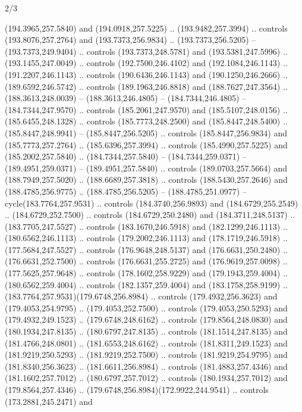 \begin{flagdescription}{2/3}
\begin{scope}[xshift=0.5\flaglength,yshift=0.5\flagwidth,scale=\flagwidth/235.81]
\begin{scope}[y=0.8pt, x=0.8pt, yscale=-1,shift={(-239.08,-147.38)}]
    (194.3965,257.5840) and (194.0918,257.5225) .. (193.9482,257.3994) .. controls
    (193.8076,257.2764) and (193.7373,256.9834) .. (193.7373,256.5205) --
    (193.7373,249.9404) .. controls (193.7373,248.5781) and (193.5381,247.5996) ..
    (193.1455,247.0049) .. controls (192.7500,246.4102) and (192.1084,246.1143) ..
    (191.2207,246.1143) .. controls (190.6436,246.1143) and (190.1250,246.2666) ..
    (189.6592,246.5742) .. controls (189.1963,246.8818) and (188.7627,247.3564) ..
    (188.3613,248.0039) -- (188.3613,246.4805) -- (184.7344,246.4805) --
    (184.7344,247.9570) .. controls (185.2061,247.9570) and (185.5107,248.0156) ..
    (185.6455,248.1328) .. controls (185.7773,248.2500) and (185.8447,248.5400) ..
    (185.8447,248.9941) -- (185.8447,256.5205) .. controls (185.8447,256.9834) and
    (185.7773,257.2764) .. (185.6396,257.3994) .. controls (185.4990,257.5225) and
    (185.2002,257.5840) .. (184.7344,257.5840) -- (184.7344,259.0371) --
    (189.4951,259.0371) -- (189.4951,257.5840) .. controls (189.0703,257.5664) and
    (188.7949,257.5020) .. (188.6689,257.3818) .. controls (188.5430,257.2646) and
    (188.4785,256.9775) .. (188.4785,256.5205) -- (188.4785,251.0977) --
    cycle(183.7764,257.9531) .. controls (184.3740,256.9893) and
    (184.6729,255.2549) .. (184.6729,252.7500) .. controls (184.6729,250.2480) and
    (184.3711,248.5137) .. (183.7705,247.5527) .. controls (183.1670,246.5918) and
    (182.1299,246.1113) .. (180.6562,246.1113) .. controls (179.2002,246.1113) and
    (178.1719,246.5918) .. (177.5684,247.5527) .. controls (176.9648,248.5137) and
    (176.6631,250.2480) .. (176.6631,252.7500) .. controls (176.6631,255.2725) and
    (176.9619,257.0098) .. (177.5625,257.9648) .. controls (178.1602,258.9229) and
    (179.1943,259.4004) .. (180.6562,259.4004) .. controls (182.1357,259.4004) and
    (183.1758,258.9199) .. (183.7764,257.9531)(179.6748,256.8984) .. controls
    (179.4932,256.3623) and (179.4053,254.9795) .. (179.4053,252.7500) .. controls
    (179.4053,250.5293) and (179.4932,249.1523) .. (179.6748,248.6162) .. controls
    (179.8564,248.0830) and (180.1934,247.8135) .. (180.6797,247.8135) .. controls
    (181.1514,247.8135) and (181.4766,248.0801) .. (181.6553,248.6162) .. controls
    (181.8311,249.1523) and (181.9219,250.5293) .. (181.9219,252.7500) .. controls
    (181.9219,254.9795) and (181.8340,256.3623) .. (181.6611,256.8984) .. controls
    (181.4883,257.4346) and (181.1602,257.7012) .. (180.6797,257.7012) .. controls
    (180.1934,257.7012) and (179.8564,257.4346) ..
    (179.6748,256.8984)(172.9922,244.9541) .. controls (173.2881,245.2471) and

\end{scope}
\end{scope}
\end{flagdescription}
